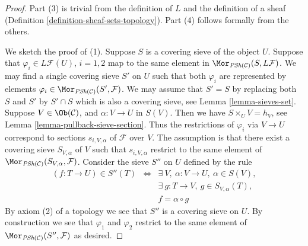 \begin{proof}
Part (3) is trivial from the definition of $L$ and
the definition of a sheaf (Definition \ref{definition-sheaf-sets-topology}).
Part (4) follows formally from the others.

\medskip\noindent
We sketch the proof of (1). Suppose $S$ is a covering sieve
of the object $U$. Suppose that $\varphi_i \in L\mathcal{F}(U)$,
$i = 1, 2$ map to the same element in
$\Mor_{\textit{PSh}(\mathcal{C})}(S, L\mathcal{F})$.
We may find a single covering sieve $S'$ on $U$ such
that both $\varphi_i$ are represented by elements
$\varphi_i \in \Mor_{\textit{PSh}(\mathcal{C})}(S', \mathcal{F})$.
We may assume that $S' = S$ by replacing both $S$ and $S'$ by
$S' \cap S$ which is also a covering sieve, see Lemma \ref{lemma-sieves-set}.
Suppose $V\in \Ob(\mathcal{C})$, and
$\alpha : V \to U$ in $S(V)$.
Then we have $S \times_U V = h_V$,
see Lemma \ref{lemma-pullback-sieve-section}. Thus the restrictions
of $\varphi_i$ via $V \to U$ correspond to sections $s_{i, V, \alpha}$
of $\mathcal{F}$ over $V$. The assumption is that there exist
a covering sieve $S_{V, \alpha}$ of $V$ such that
$s_{i, V, \alpha}$ restrict to the same element of
$\Mor_{\textit{PSh}(\mathcal{C})}(S_{V, \alpha}, \mathcal{F})$.
Consider the sieve $S''$ on $U$ defined by the rule
\begin{eqnarray}
\label{equation-S-prime-prime}
(f : T \to U) \in S''(T)
& \Leftrightarrow &
\exists\ V , \ \alpha : V \to U, \ \alpha \in S(V), \nonumber \\
& &
\exists\ g : T \to V, \ g \in S_{V, \alpha}(T), \\
& &
f = \alpha \circ g \nonumber
\end{eqnarray}
By axiom (2) of a topology we see that $S''$ is a covering
sieve on $U$. By construction we see that $\varphi_1$
and $\varphi_2$ restrict to the same element of
$\Mor_{\textit{PSh}(\mathcal{C})}(S'', \mathcal{F})$
as desired.


\end{proof}
